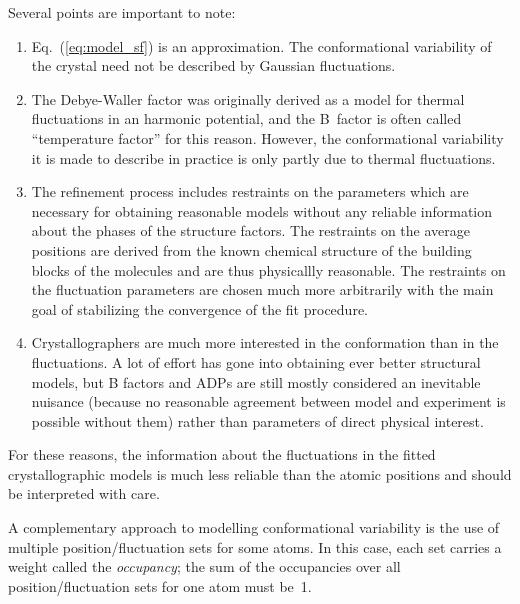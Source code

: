 \documentclass[12pt]{article}
\begin{document}
\begin{sloppy}
Several points are important to note:
\begin{enumerate}
\item
  Eq.~(\ref{eq:model_sf}) is an approximation. The conformational
  variability of the crystal need not be described by Gaussian
  fluctuations.
\item
  The Debye-Waller factor was originally derived as a model for
  thermal fluctuations in an harmonic potential, and the B~factor is
  often called ``temperature factor'' for this reason. However, the
  conformational variability it is made to describe in practice is
  only partly due to thermal fluctuations.
\item
  The refinement process includes restraints on the parameters which
  are necessary for obtaining reasonable models without any reliable
  information about the phases of the structure factors.
  The restraints on the average positions are derived from the known
  chemical structure of the building blocks of the molecules and are
  thus physicallly reasonable. The restraints on the fluctuation
  parameters are chosen much more arbitrarily with the main goal
  of stabilizing the convergence of the fit procedure.
\item
  Crystallographers are much more interested in the conformation than
  in the fluctuations. A lot of effort has gone into obtaining ever
  better structural models, but B factors and ADPs are still mostly
  considered an inevitable nuisance (because no reasonable agreement
  between model and experiment is possible without them) rather than
  parameters of direct physical interest.
\end{enumerate}
For these reasons, the information about the fluctuations in the fitted
crystallographic models is much less reliable than the atomic positions
and should be interpreted with care.

A complementary approach to modelling conformational variability is
the use of multiple position/fluctuation sets for some atoms. In this
case, each set carries a weight called the \textit{occupancy}; the sum
of the occupancies over all position/fluctuation sets for one atom
must be~1.

\vspace{3mm}


\end{sloppy}
\end{document}
